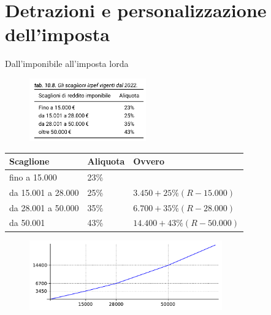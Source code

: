 \documentclass[11pt]{beamer}
\newcommand\€{\,\text{€}}
\begin{document}
\section{Detrazioni e personalizzazione dell'imposta}


\begin{frame}{Dall'imponibile all'imposta lorda}
\begin{figure}
\centering
\includegraphics[height=2.7cm]{./figure/scaglioni-IRPEF-2022.png}
\end{figure}

\small
\begin{center}
\begin{tabular}{lll}
Scaglione & Aliquota & Ovvero\\[0pt]
\hline
fino a 15.000 & 23\% & \\[0pt]
da 15.001 a 28.000 & 25\% & $3.450 + 25\% (R - 15.000)$\\[0pt]
da 28.001 a 50.000 & 35\% & $6.700 + 35\% (R - 28.000)$\\[0pt]
da 50.001 & 43\% & $14.400 + 43\% (R - 50.000)$\\[0pt]
\end{tabular}
\end{center}

\begin{figure}
\centering
\includegraphics[height=3cm]{./figure/scaglioni-2022-grafico.pdf}
\end{figure}
\end{frame}
\end{document}
